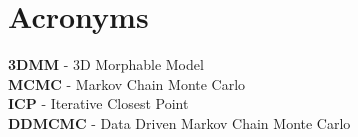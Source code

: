 \chapter{Acronyms}
        \textbf{3DMM} - 3D Morphable Model\\
        \textbf{MCMC} - Markov Chain Monte Carlo\\
        \textbf{ICP} - Iterative Closest Point\\
        \textbf{DDMCMC} - Data Driven Markov Chain Monte Carlo

